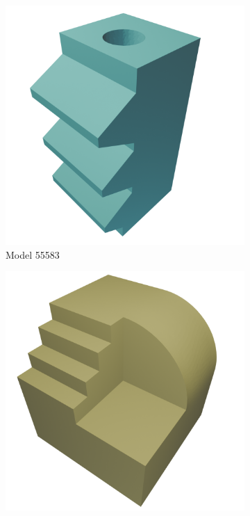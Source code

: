 \begin{figure}[htb]
\centering
\begin{subfigure}{0.3\textwidth}
	\includegraphics[width=\textwidth]{../resources/models/55583.png}
	\caption{Model 55583}
	\label{sfig:55583}
\end{subfigure}
\hfill
\begin{subfigure}{0.3\textwidth}
	\includegraphics[width=\textwidth]{../resources/models/7120369.png}

\end{subfigure}
\end{figure}
